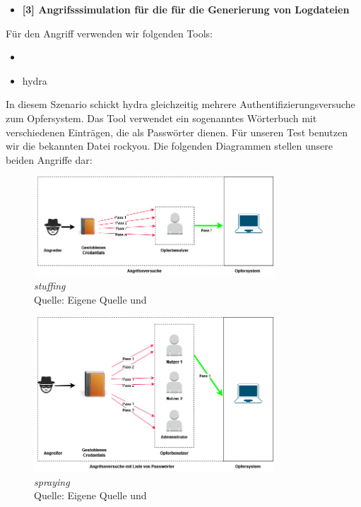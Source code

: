 \begin{itemize}[noitemsep]
   \item	\textbf{[3] Angrifsssimulation für die für die Generierung von Logdateien}
\end{itemize}

Für den Angriff verwenden wir folgenden Tools:

\begin{itemize}[noitemsep]
   \item	{}
   \item \gls{hydra}
\end{itemize}

In diesem Szenario schickt \gls{hydra} gleichzeitig mehrere Authentifizierungsversuche zum Opfersystem. Das Tool verwendet ein sogenanntes  Wörterbuch mit verschiedenen Einträgen, die als Passwörter dienen. Für unseren Test benutzen wir die bekannten Datei \gls{rockyou}. Die folgenden Diagrammen stellen unsere beiden Angriffe dar:


\begin{figure}[H]
   \centering
   \includegraphics[width=0.8\textwidth]{assets/Stuffing.jpg}
   \caption{\textit{\gls{stuffing}}\\Quelle: Eigene Quelle und \citep{Nguyen_stuffing}}
   \centering
\end{figure}


\begin{figure}[H]
   \centering
   \includegraphics[width=0.8\textwidth]{assets/Spraying.jpg}
   \caption{\textit{\gls{spraying}}\\Quelle: Eigene Quelle und \citep{Swathi_spraxy}}
   \centering
\end{figure}


